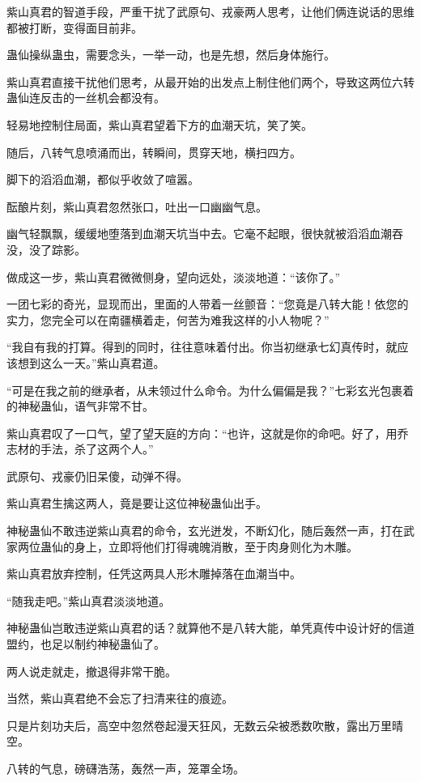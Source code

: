 \begin{this_body}
紫山真君的智道手段，严重干扰了武原句、戎豪两人思考，让他们俩连说话的思维都被打断，变得面目前非。

蛊仙操纵蛊虫，需要念头，一举一动，也是先想，然后身体施行。

紫山真君直接干扰他们思考，从最开始的出发点上制住他们两个，导致这两位六转蛊仙连反击的一丝机会都没有。

轻易地控制住局面，紫山真君望着下方的血潮天坑，笑了笑。

随后，八转气息喷涌而出，转瞬间，贯穿天地，横扫四方。

脚下的滔滔血潮，都似乎收敛了喧嚣。

酝酿片刻，紫山真君忽然张口，吐出一口幽幽气息。

幽气轻飘飘，缓缓地堕落到血潮天坑当中去。它毫不起眼，很快就被滔滔血潮吞没，没了踪影。

做成这一步，紫山真君微微侧身，望向远处，淡淡地道：“该你了。”

一团七彩的奇光，显现而出，里面的人带着一丝颤音：“您竟是八转大能！依您的实力，您完全可以在南疆横着走，何苦为难我这样的小人物呢？”

“我自有我的打算。得到的同时，往往意味着付出。你当初继承七幻真传时，就应该想到这么一天。”紫山真君道。

“可是在我之前的继承者，从未领过什么命令。为什么偏偏是我？”七彩玄光包裹着的神秘蛊仙，语气非常不甘。

紫山真君叹了一口气，望了望天庭的方向：“也许，这就是你的命吧。好了，用乔志材的手法，杀了这两个人。”

武原句、戎豪仍旧呆傻，动弹不得。

紫山真君生擒这两人，竟是要让这位神秘蛊仙出手。

神秘蛊仙不敢违逆紫山真君的命令，玄光迸发，不断幻化，随后轰然一声，打在武家两位蛊仙的身上，立即将他们打得魂魄消散，至于肉身则化为木雕。

紫山真君放弃控制，任凭这两具人形木雕掉落在血潮当中。

“随我走吧。”紫山真君淡淡地道。

神秘蛊仙岂敢违逆紫山真君的话？就算他不是八转大能，单凭真传中设计好的信道盟约，也足以制约神秘蛊仙了。

两人说走就走，撤退得非常干脆。

当然，紫山真君绝不会忘了扫清来往的痕迹。

只是片刻功夫后，高空中忽然卷起漫天狂风，无数云朵被悉数吹散，露出万里晴空。

八转的气息，磅礴浩荡，轰然一声，笼罩全场。


\end{this_body}
